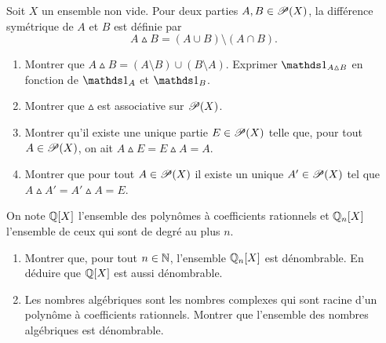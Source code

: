 
%
    \begin{td-exo}
    Soit \(X\) un ensemble non vide. Pour deux parties \(A,B\in\mathscr{P}(X)\), la différence symétrique de \(A\) et \(B\) est définie par
    \[
    A\vartriangle B = (A\cup B)\setminus (A\cap B).
    \]
    \begin{enumerate}
        \item Montrer que \(A\vartriangle B=(A\setminus B)\cup(B\setminus A)\). Exprimer \(\one_{A\vartriangle B}\) en fonction de \(\one_A\) et \(\one_B\).
        \item Montrer que \(\vartriangle\) est associative sur \(\mathscr{P}(X)\).
        \item Montrer qu'il existe une unique partie \(E\in\mathscr{P}(X)\) telle que, pour tout \(A\in\mathscr{P}(X)\), on ait
        \(A\vartriangle E = E\vartriangle A = A\).
        \item Montrer que pour tout \(A\in\mathscr{P}(X)\) il existe un unique \(A'\in\mathscr{P}(X)\) tel que \(A\vartriangle A'=A'\vartriangle A = E\).
    \end{enumerate}
\end{td-exo}


%
    \begin{td-exo}
    On note \(\mathbb{Q}[X]\) l'ensemble des polynômes à coefficients rationnels et \(\mathbb{Q}_n[X]\) l'ensemble de ceux qui sont de degré au plus \(n\).
    \begin{enumerate}
        \item Montrer que, pour tout \(n\in\mathbb{N}\), l'ensemble \(\mathbb{Q}_n[X]\) est dénombrable. En déduire que \(\mathbb{Q}[X]\) est aussi dénombrable.
        \item Les nombres algébriques sont les nombres complexes qui sont racine d'un polynôme à coefficients rationnels. Montrer que l'ensemble des nombres algébriques est dénombrable.
    \end{enumerate}
\end{td-exo}
